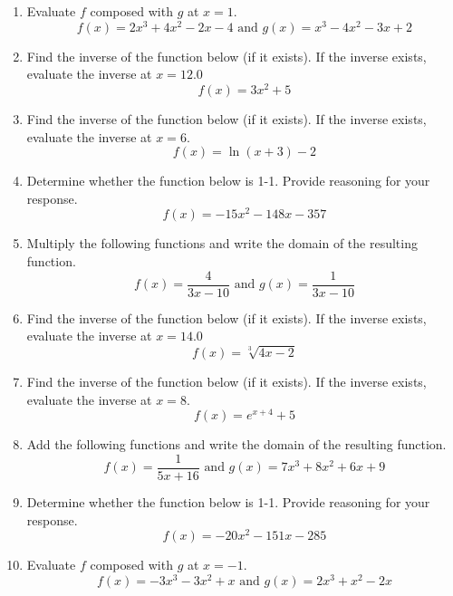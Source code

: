 \documentclass[14pt]{extbook}
\begin{document}
\begin{enumerate}
\item{
Evaluate $f$ composed with $g$ at $x=1$.\[ f(x) = 2x^{3} +4 x^{2} -2 x -4 \text{ and } g(x) = x^{3} -4 x^{2} -3 x + 2 \]} \newpage
\item{
Find the inverse of the function below (if it exists). If the inverse exists, evaluate the inverse at $x = 12.0$\[ f(x) = 3 x^2 + 5 \]} \newpage
\item{
Find the inverse of the function below (if it exists). If the inverse exists, evaluate the inverse at $x = 6$.\[ f(x) = \ln{(x+3)}-2 \]} \newpage
\item{
Determine whether the function below is 1-1. Provide reasoning for your response.\[ f(x) = -15 x^2 - 148 x - 357 \]} \newpage
\item{
Multiply the following functions and write the domain of the resulting function.\[ f(x) = \frac{4}{3x-10} \text{ and } g(x) = \frac{1}{3x-10} \]} \newpage
\item{
Find the inverse of the function below (if it exists). If the inverse exists, evaluate the inverse at $x = 14.0$\[ f(x) = \sqrt[3]{4 x - 2} \]} \newpage
\item{
Find the inverse of the function below (if it exists). If the inverse exists, evaluate the inverse at $x = 8$.\[ f(x) = e^{x+4}+5 \]} \newpage
\item{
Add the following functions and write the domain of the resulting function.\[ f(x) = \frac{1}{5x+16} \text{ and } g(x) = 7x^{3} +8 x^{2} +6 x + 9 \]} \newpage
\item{
Determine whether the function below is 1-1. Provide reasoning for your response.\[ f(x) = -20 x^2 - 151 x - 285 \]} \newpage
\item{
Evaluate $f$ composed with $g$ at $x=-1$.\[ f(x) = -3x^{3} -3 x^{2} +x \text{ and } g(x) = 2x^{3} + x^{2} -2 x \]} \newpage
\end{enumerate}
\end{document}
